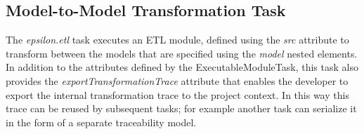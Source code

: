 \subsection{Model-to-Model Transformation Task}

The \emph{epsilon.etl} task executes an ETL module, defined using the \emph{src} attribute to transform between the models that are specified using the \emph{model} nested elements. In addition to the attributes defined by the ExecutableModuleTask, this task also provides the \emph{exportTransformationTrace} attribute that enables the developer to export the internal transformation trace to the project context. In this way this trace can be reused by subsequent tasks; for example another task can serialize it in the form of a separate traceability model.

